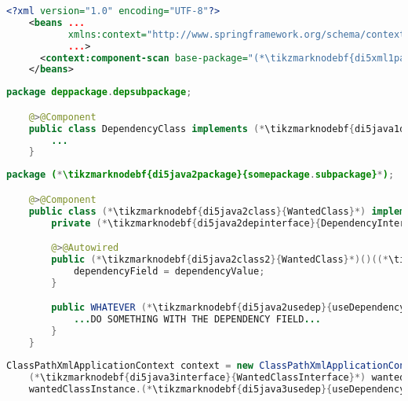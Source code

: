 \label{constructorinjectionautowire}
\begin{lstlisting}[language=XML, title={Configuration XML}]
    <?xml version="1.0" encoding="UTF-8"?>
    <beans ...
           xmlns:context="http://www.springframework.org/schema/context"
           ...>
      <context:component-scan base-package="(*\tikzmarknodebf{di5xml1package}{somepackage.subpackage}[ForestGreen]*)"/>
    </beans>
\end{lstlisting}
\begin{lstlisting}[language=Java, title={Dependency class}]
    package deppackage.depsubpackage;

    @>@Component
    public class DependencyClass implements (*\tikzmarknodebf{di5java1depinterface}{DependencyInterface}*) {
        ...
    }
\end{lstlisting}
\begin{lstlisting}[language=Java, title={Wanted class with the constructor}]
    package (*\tikzmarknodebf{di5java2package}{somepackage.subpackage}*);

    @>@Component
    public class (*\tikzmarknodebf{di5java2class}{WantedClass}*) implements (*\tikzmarknodebf{di5java2interface}{WantedClassInterface}*) {
        private (*\tikzmarknodebf{di5java2depinterface}{DependencyInterface}*) dependencyField;

        @>@Autowired
        public (*\tikzmarknodebf{di5java2class2}{WantedClass}*)()((*\tikzmarknodebf{di5java2depinterface2}{DependencyInterface}*) dependencyValue) {
            dependencyField = dependencyValue;
        }

        public WHATEVER (*\tikzmarknodebf{di5java2usedep}{useDependency}*)() {
            ...DO SOMETHING WITH THE DEPENDENCY FIELD...
        }
    }
\end{lstlisting}
\begin{lstlisting}[language=Java, title={Usage}]
    ClassPathXmlApplicationContext context = new ClassPathXmlApplicationContext("configurationFile.xml");
    (*\tikzmarknodebf{di5java3interface}{WantedClassInterface}*) wantedClassInstance = context.getBean("(*\tikzmarknodebf{di5java3beanid}{wantedClass}[ForestGreen]*)", (*\tikzmarknodebf{di5java3interface2}{WantedClassInterface}*).class);
    wantedClassInstance.(*\tikzmarknodebf{di5java3usedep}{useDependency}*)();
\end{lstlisting}
\newpage

